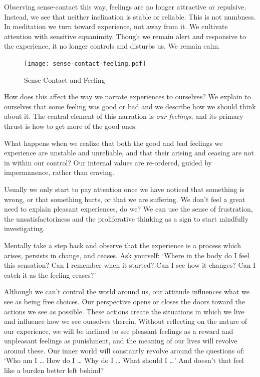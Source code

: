 Observing sense-contact this way, feelings are no longer attractive or
repulsive. Instead, we see that neither inclination is stable or
reliable. This is not numbness. In meditation we turn toward experience,
not away from it. We cultivate attention with sensitive equanimity.
Though we remain alert and responsive to the experience, it no longer
controls and disturbs us. We remain calm.

\clearpage

\begin{figure}[h]
\caption{Sense Contact and Feeling}\label{fig-sense-contact-feeling}
\bigskip\centering
\texttt{[image: sense-contact-feeling.pdf]}
\end{figure}

\clearpage


How does this affect the way we narrate experiences to ourselves? We
explain to ourselves that some feeling was good or bad and we describe
how we should think about it. The central element of this narration is
\emph{our feelings}, and its primary thrust is how to get more of the
good ones.

What happens when we realize that both the good and bad feelings we
experience are unstable and unreliable, and that their arising and
ceasing are not in within our control? Our internal values are
re-ordered, guided by impermanence, rather than craving.


Usually we only start to pay attention once we have noticed that
something is wrong, or that something hurts, or that we are suffering.
We don't feel a great need to explain pleasant experiences, do we? We
can use the sense of frustration, the unsatisfactoriness and the
proliferative thinking as a sign to start mindfully investigating.

Mentally take a step back and observe that the experience is a process
which arises, persists in change, and ceases. Ask yourself: `Where in
the body do I feel this sensation? Can I remember when it started? Can I
see how it changes? Can I catch it as the feeling ceases?'

Although we can't control the world around us, our attitude influences
what we see as being free choices. Our perspective opens or closes the
doors toward the actions we see as possible. These actions create the
situations in which we live and influence how we see ourselves therein.
Without reflecting on the nature of our experience, we will be inclined
to see pleasant feelings as a reward and unpleasant feelings as
punishment, and the meaning of our lives will revolve around these. Our
inner world will constantly revolve around the questions of: `Who am I
\ldots{} How do I \ldots{} Why do I \ldots{} What should I \ldots{}' And
doesn't that feel like a burden better left behind?

